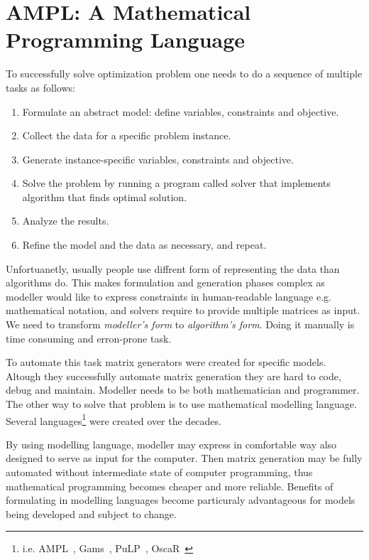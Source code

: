 \section{AMPL: A Mathematical Programming Language}
\label{sec:ampl:ampl}

To successfully solve optimization problem one needs to do a sequence of multiple tasks as follows:

\begin{enumerate}
  \item Formulate an abstract model: define variables, constraints and objective.
  \item Collect the data for a specific problem instance.
  \item Generate instance-specific variables, constraints and objective.
  \item Solve the problem by running a program called solver that implements algorithm that finds optimal solution.
  \item Analyze the results.
  \item Refine the model and the data as necessary, and repeat.
\end{enumerate}

Unfortuanetly, usually people use diffrent form of representing the data than algorithms do. This makes formulation and generation phases complex as modeller would like to express constraints in human-readable language e.g. mathematical notation, and solvers require to provide multiple matrices as input. We need to transform \emph{modeller's form} to \emph{algorithm's form}. Doing it manually is time consuming and erron-prone task.

To automate this task matrix generators were created for specific models. Altough they successfully automate matrix generation they are hard to code, debug and maintain. Modeller needs to be both mathematician and programmer. The other way to solve that problem is to use mathematical modelling language. Several languages\footnote{i.e. AMPL~\cite{Fourer2002}, Gams~\cite{Gams}, PuLP~\cite{PuLP}, OscaR~\cite{OscaR}} were created over the decades. 

By using modelling language, modeller may express in comfortable way also designed to serve as input for the computer. Then matrix generation may be fully automated without intermediate state of computer programming, thus mathematical programming becomes cheaper and more reliable. Benefits of formulating in modelling languages become particuraly advantageous for models being developed and subject to change.

